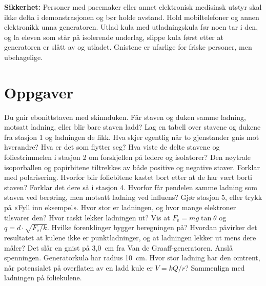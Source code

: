 \documentclass[11pt]{article}
\begin{document}
\textbf{Sikkerhet:} Personer med pacemaker eller annet elektronisk medisinsk utstyr skal ikke delta i demonstrasjonen og bør holde avstand. Hold mobiltelefoner og annen elektronikk unna generatoren. Utlad kula med utladningskula før noen tar i den, og la eleven som står på isolerende underlag, slippe kula først etter at generatoren er slått av og utladet. Gnistene er ufarlige for friske personer, men ubehagelige.

\section*{Oppgaver}

\begin{oppgaveliste}
\oppgave {}Du gnir ebonittstaven med skinnduken. Får staven og duken samme ladning, motsatt ladning, eller blir bare staven ladd?
\svar
\oppgave {}Lag en tabell over stavene og dukene fra stasjon 1 og ladningen de fikk. Hva skjer egentlig når to gjenstander gnis mot hverandre? Hva er det som flytter seg?
\svar
\oppgave {}Hva viste de delte stavene og foliestrimmelen i stasjon 2 om forskjellen på ledere og isolatorer?
\svar
\oppgave {}Den nøytrale isoporballen og papirbitene tiltrekkes av både positive og negative staver. Forklar med polarisering. Hvorfor blir foliebitene kastet bort etter at de har vært borti staven?
\svar
\oppgave {}Forklar det dere så i stasjon 4. Hvorfor får pendelen samme ladning som staven ved berøring, men motsatt ladning ved influens?
\svar
\oppgave {}Gjør stasjon 5, eller trykk på «Fyll inn eksempel». Hvor stor er ladningen, og hvor mange elektroner tilsvarer den? Hvor raskt lekker ladningen ut? Vis at $F_{\mathrm{e}} = mg \tan  θ$ og $q = d \cdot \sqrt{F_{\mathrm{e}}/k}$.
\svar
\oppgave {}Hvilke forenklinger bygger beregningen på? Hvordan påvirker det resultatet at kulene ikke er punktladninger, og at ladningen lekker ut mens dere måler?
\svar
\oppgave {}Det slår en gnist på 3,0~cm fra Van de Graaff-generatoren. Anslå spenningen. Generatorkula har radius 10~cm. Hvor stor ladning har den omtrent, når potensialet på overflaten av en ladd kule er $V = kQ/r$? Sammenlign med ladningen på foliekulene.
\svar
\end{oppgaveliste}
\end{document}
